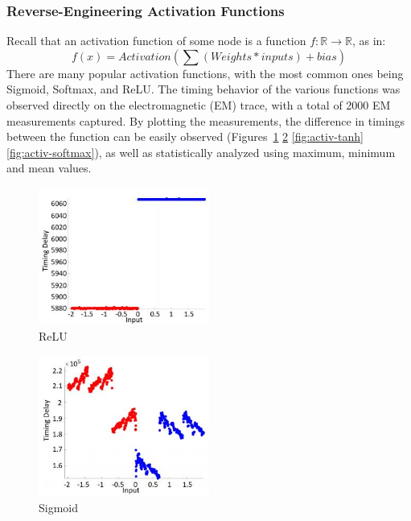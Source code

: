 \subsubsection{Reverse-Engineering Activation Functions}
Recall that an activation function of some node is a function $f: \mathbb{R} \rightarrow \mathbb{R}$, as in:
$$f(x)=Activation(\sum(Weights * inputs) + bias)$$
There are many popular activation functions, with the most common ones being Sigmoid, Softmax, and ReLU.
The timing behavior of the various functions was observed directly on the electromagnetic (EM) trace, with a total of 2000 EM measurements captured.
By plotting the measurements, the difference in timings between the function can be easily observed (Figures~\ref{fig:activ-relu} \ref{fig:activ-sigmoid} \ref{fig:activ-tanh} \ref{fig:activ-softmax}), as well as statistically analyzed using maximum, minimum and mean values.

\begin{figure}
    \centering
    \includegraphics[width=0.5\textwidth]{images/chapter8/activ-relu-a.JPG}
    \caption{ReLU}
    \label{fig:activ-relu}
\end{figure}

\begin{figure}
    \centering
    \includegraphics[width=0.5\textwidth]{images/chapter8/activ-sigmoid-b.JPG}
    \caption{Sigmoid}
    \label{fig:activ-sigmoid}
\end{figure}


